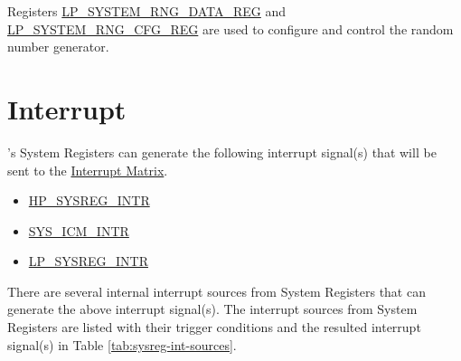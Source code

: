 \documentclass[main\_\_EN.tex]{subfiles}
\begin{document}
Registers \hyperref[regdesc:LPSYSTEMRNGDATAREG]{LP\_SYSTEM\_RNG\_DATA\_REG} and \hyperref[regdesc:LPSYSTEMRNGCFGREG]{LP\_SYSTEM\_RNG\_CFG\_REG} are used to configure and control the random number generator.

\section{Interrupt}

\chipname{}'s System Registers can generate the following interrupt signal(s) that will be sent to the \hyperref[mod:intmtrx]{Interrupt Matrix}.

    \begin{itemize}
        \item \hyperref[tab:sysreg-int-sources]{HP\_SYSREG\_INTR}
        \item \hyperref[tab:sysreg-int-sources]{SYS\_ICM\_INTR}
        \item \hyperref[tab:sysreg-int-sources]{LP\_SYSREG\_INTR}
    \end{itemize}

There are several internal interrupt sources from System Registers that can generate the above interrupt signal(s). The interrupt sources from System Registers are listed with their trigger conditions and the resulted interrupt signal(s) in Table \ref{tab:sysreg-int-sources}.
\end{document}
